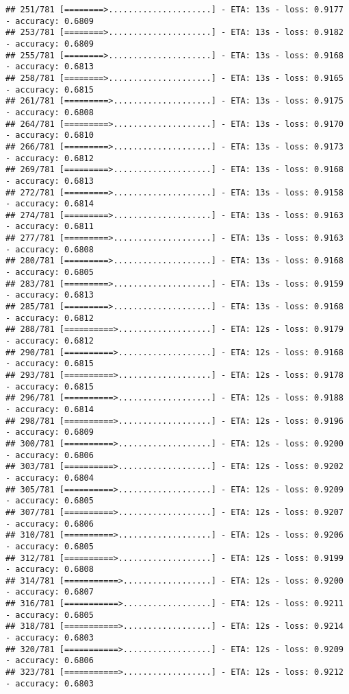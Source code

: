 \documentclass[
]{article}
\begin{document}
\begin{verbatim}
## 251/781 [========>.....................] - ETA: 13s - loss: 0.9177 - accuracy: 0.6809
## 253/781 [========>.....................] - ETA: 13s - loss: 0.9182 - accuracy: 0.6809
## 255/781 [========>.....................] - ETA: 13s - loss: 0.9168 - accuracy: 0.6813
## 258/781 [========>.....................] - ETA: 13s - loss: 0.9165 - accuracy: 0.6815
## 261/781 [=========>....................] - ETA: 13s - loss: 0.9175 - accuracy: 0.6808
## 264/781 [=========>....................] - ETA: 13s - loss: 0.9170 - accuracy: 0.6810
## 266/781 [=========>....................] - ETA: 13s - loss: 0.9173 - accuracy: 0.6812
## 269/781 [=========>....................] - ETA: 13s - loss: 0.9168 - accuracy: 0.6813
## 272/781 [=========>....................] - ETA: 13s - loss: 0.9158 - accuracy: 0.6814
## 274/781 [=========>....................] - ETA: 13s - loss: 0.9163 - accuracy: 0.6811
## 277/781 [=========>....................] - ETA: 13s - loss: 0.9163 - accuracy: 0.6808
## 280/781 [=========>....................] - ETA: 13s - loss: 0.9168 - accuracy: 0.6805
## 283/781 [=========>....................] - ETA: 13s - loss: 0.9159 - accuracy: 0.6813
## 285/781 [=========>....................] - ETA: 13s - loss: 0.9168 - accuracy: 0.6812
## 288/781 [==========>...................] - ETA: 12s - loss: 0.9179 - accuracy: 0.6812
## 290/781 [==========>...................] - ETA: 12s - loss: 0.9168 - accuracy: 0.6815
## 293/781 [==========>...................] - ETA: 12s - loss: 0.9178 - accuracy: 0.6815
## 296/781 [==========>...................] - ETA: 12s - loss: 0.9188 - accuracy: 0.6814
## 298/781 [==========>...................] - ETA: 12s - loss: 0.9196 - accuracy: 0.6809
## 300/781 [==========>...................] - ETA: 12s - loss: 0.9200 - accuracy: 0.6806
## 303/781 [==========>...................] - ETA: 12s - loss: 0.9202 - accuracy: 0.6804
## 305/781 [==========>...................] - ETA: 12s - loss: 0.9209 - accuracy: 0.6805
## 307/781 [==========>...................] - ETA: 12s - loss: 0.9207 - accuracy: 0.6806
## 310/781 [==========>...................] - ETA: 12s - loss: 0.9206 - accuracy: 0.6805
## 312/781 [==========>...................] - ETA: 12s - loss: 0.9199 - accuracy: 0.6808
## 314/781 [===========>..................] - ETA: 12s - loss: 0.9200 - accuracy: 0.6807
## 316/781 [===========>..................] - ETA: 12s - loss: 0.9211 - accuracy: 0.6805
## 318/781 [===========>..................] - ETA: 12s - loss: 0.9214 - accuracy: 0.6803
## 320/781 [===========>..................] - ETA: 12s - loss: 0.9209 - accuracy: 0.6806
## 323/781 [===========>..................] - ETA: 12s - loss: 0.9212 - accuracy: 0.6803

\end{verbatim}
\end{document}

